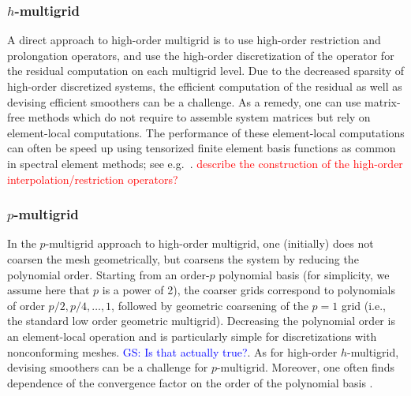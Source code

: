 \documentclass[smallcondensed,final]{svjour3}     %
\newcommand{\todo}[1]{\textcolor{red}{ #1}}
\newcommand{\gsnote}[1]{\textcolor{blue}{GS: #1}}
\begin{document}
\subsubsection{$h$-multigrid}\label{subsec:h}
A direct approach to high-order multigrid is to use high-order
restriction and prolongation operators, and use the high-order
discretization of the operator for the residual computation on each
multigrid level.
Due to the decreased sparsity of high-order discretized systems, the
efficient computation of the residual as well as devising efficient
smoothers can be a challenge. As a remedy, one can use matrix-free
methods which do not require to assemble system matrices but rely on
element-local computations. The performance of these element-local
computations can often be speed up using tensorized finite element
basis functions as common in spectral element methods; see
e.g.~\cite{DevilleFischerMund02}.  \todo{describe the construction of
  the high-order interpolation/restriction operators?}

\subsubsection{$p$-multigrid}\label{subsec:p}
In the $p$-multigrid approach to high-order multigrid, one (initially)
does not coarsen the mesh geometrically, but coarsens the system by
reducing the polynomial order. Starting from an order-$p$ polynomial
basis (for simplicity, we assume here that $p$ is a power of 2), the
coarser grids correspond to polynomials of order $p/2, p/4,\ldots,1$,
followed by geometric coarsening of the $p=1$ grid (i.e., the standard
low order geometric multigrid). Decreasing the polynomial order is an
element-local operation and is particularly simple for discretizations
with nonconforming meshes. \gsnote{Is that actually true?}. As for
high-order $h$-multigrid, devising smoothers can be a challenge for
$p$-multigrid.  Moreover, one often finds dependence of the
convergence factor on the order of the polynomial basis
\cite{MadayMunoz89}.
\end{document}
